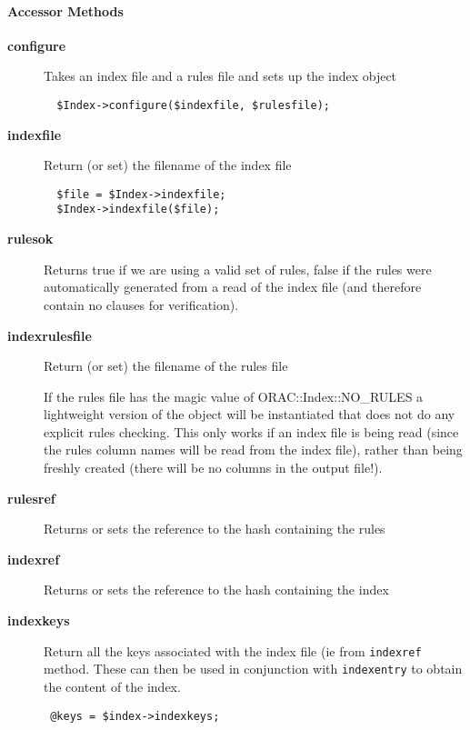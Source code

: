 \paragraph*{Accessor Methods\label{ORAC::Index_Accessor_Methods}}
\begin{description}

\item[\textbf{configure}] \mbox{}

Takes an index file and a rules file and sets up the index object

\begin{verbatim}
  $Index->configure($indexfile, $rulesfile);
\end{verbatim}

\item[\textbf{indexfile}] \mbox{}

Return (or set) the filename of the index file

\begin{verbatim}
  $file = $Index->indexfile;
  $Index->indexfile($file);
\end{verbatim}

\item[\textbf{rulesok}] \mbox{}

Returns true if we are using a valid set of rules, false
if the rules were automatically generated from a read of the
index file (and therefore contain no clauses for verification).


\item[\textbf{indexrulesfile}] \mbox{}

Return (or set) the filename of the rules file



If the rules file has the magic value of ORAC::Index::NO\_RULES a lightweight
version of the object will be instantiated that does not do any
explicit rules checking. This only works if an index file is being
read (since the rules column names will be read from the index file),
rather than being freshly created (there will be no columns in the
output file!).


\item[\textbf{rulesref}] \mbox{}

Returns or sets the reference to the hash containing the rules


\item[\textbf{indexref}] \mbox{}

Returns or sets the reference to the hash containing the index


\item[\textbf{indexkeys}] \mbox{}

Return all the keys associated with the index file (ie from \texttt{indexref}
method. These can then be used in conjunction with \texttt{indexentry} to obtain
the content of the index.

\begin{verbatim}
 @keys = $index->indexkeys;
\end{verbatim}
\end{description}
